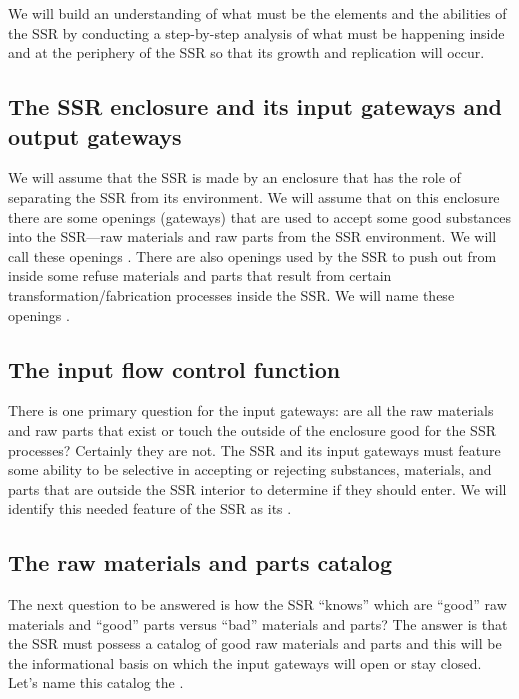 We will build an
understanding of what must be the elements and the abilities of the
SSR by conducting a step-by-step analysis of what must be happening inside and at
the periphery of the SSR so that its growth and replication will occur.

\subsection[The SSR enclosure and its input gateways and output
gateways]{The SSR enclosure and its input gateways and output gateways}

We will assume that the SSR is
made by an enclosure that has the role of separating the SSR from its
environment. We will assume that on this enclosure there are some
openings (gateways) that are used to accept some good
substances into the SSR---raw materials and raw parts from the SSR environment. We
will call these openings . There are also
openings used by the SSR to push out from inside some refuse materials
and parts that result from certain transformation/fabrication processes
inside the SSR. We will name these openings .

\subsection[The input flow control function]{The input flow control
function}

There is one primary question
for the input gateways: are all the raw materials and raw parts that
exist or touch the outside of the enclosure good for the SSR processes?
Certainly they are not. The SSR and its input gateways must feature some
ability to be selective in accepting or rejecting substances, materials,
and parts that are outside the SSR interior to determine if they should enter. We will
identify this needed feature of the SSR as its .

\subsection[The raw materials and parts catalog]{The raw materials and
parts catalog}

The next question to be answered
is how the SSR “knows” which are “good” raw materials and “good” parts
versus “bad” materials and parts? The answer is that the SSR must
possess a catalog of good raw materials and parts and this will be the
informational basis on which the input gateways will open or stay
closed. Let’s name this catalog the .

